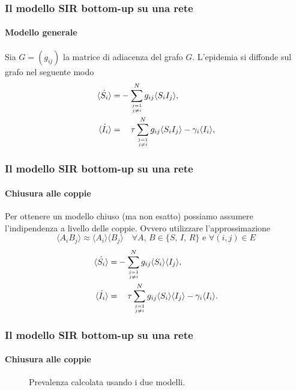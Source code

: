 \documentclass{beamer}
\newcommand{\spa}{\mathbin{\textcolor{white}{-}}}
\newcommand{\angol}[1]{\langle #1 \rangle}
\theoremstyle{definition}
\theoremstyle{plain}
\begin{document}
\begin{frame}
      \frametitle{Il modello SIR bottom-up su una rete}
\framesubtitle{Modello generale}
Sia $G = \left( g_{ij}\right)$ la matrice di adiacenza del grafo $G$. L'epidemia si diffonde sul grafo nel seguente modo 
\begin{equation*}
\begin{aligned}
	 \dot{\angol{ S_i}}=& - \sum_{j=1\atop{j\neq i }}^N g_{ij} \angol{ S_i I_j},\\
	 \dot{\angol{I_i}} =&\spa \tau \sum_{j=1\atop{j\neq i}}^N  g_{ij} \angol{ S_i I_j} -\gamma_i \angol{I_i},
\end{aligned}
\end{equation*}
\end{frame}
\begin{frame}
\frametitle{Il modello SIR bottom-up su una rete}
\framesubtitle{Chiusura alle coppie}
Per ottenere un modello chiuso (ma non esatto) possiamo assumere l'indipendenza  a livello delle coppie. Ovvero utilizzare l'approssimazione 
$$ \angol{ A_i B_j } \approx \angol{ A_i }\angol{B_j} \quad \forall A, \, B \in \{ S, \, I,\, R\} \text{ e } \forall (i,j) \in E $$
\pause
\begin{equation*}
 \begin{aligned}
	 \dot{\angol{ S_i}}=& - \sum_{j=1\atop{j\neq i }}^N g_{ij} \angol{ S_i}\angol{ I_j},\\
 	 \dot{\angol{I_i}} =&\spa \tau \sum_{j=1\atop{j\neq i}}^N  g_{ij}  \angol{S_i}\angol{ I_j} -\gamma_i \angol{I_i}.
 \end{aligned}
 \end{equation*}
\end{frame}
\begin{frame}
\frametitle{Il modello SIR bottom-up su una rete}
\framesubtitle{Chiusura alle coppie}
\begin{figure}
    \centering

    \caption{Prevalenza calcolata usando i due modelli. }
 
\end{figure}
    
\end{frame}
\end{document}
